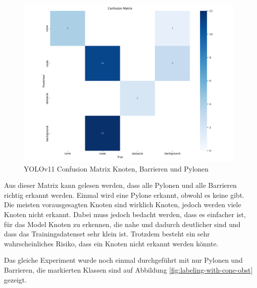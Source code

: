 \begin{figure}[H]
\centering
\includegraphics[width=\textwidth -20mm]{assets/informatik-prototyp/yolo/conf-matrix.png}
\caption{YOLOv11 Confusion Matrix Knoten, Barrieren und Pylonen}
\label{fig:conf-matrix-yolo}
\end{figure}

Aus dieser Matrix kann gelesen werden, dass alle Pylonen und alle Barrieren richtig erkannt werden. Einmal wird eine Pylone erkannt, obwohl es keine gibt. Die meisten vorausgesagten Knoten sind wirklich Knoten, jedoch werden viele Knoten nicht erkannt. Dabei muss jedoch bedacht werden, dass es einfacher ist, für das Model Knoten zu erkennen, die nahe und dadurch deutlicher sind und dass das Trainingsdatenset sehr klein ist. Trotzdem besteht ein sehr wahrscheinliches Risiko, dass ein Knoten nicht erkannt werden könnte.

Das gleiche Experiment wurde noch einmal durchgeführt mit nur Pylonen und Barrieren, die markierten Klassen sind auf Abbildung \ref{fig:labeling-with-cone-obst} gezeigt.


